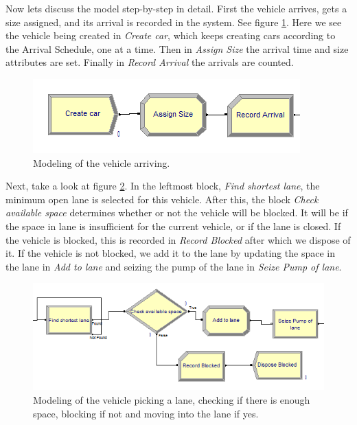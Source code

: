 Now lets discuss the model step-by-step in detail.
First the vehicle arrives, gets a size assigned, and its arrival is recorded in the system. See figure \ref{fig:vehiclearrives}. Here we see the vehicle being created in \textit{Create car}, which keeps creating cars according to the Arrival Schedule, one at a time. Then in \textit{Assign Size} the arrival time and size attributes are set. Finally in \textit{Record Arrival} the arrivals are counted.

\begin{figure}[]
\begin{center}
	\includegraphics[scale=1]{images/model-description/vehicle-arrives.PNG}
	\caption{Modeling of the vehicle arriving.}
	\label{fig:vehiclearrives}
\end{center}
\end{figure}

Next, take a look at figure \ref{fig:picklane}. In the leftmost block, \textit{Find shortest lane}, the minimum open lane is selected for this vehicle. After this, the block \textit{Check available space} determines whether or not the vehicle will be blocked. It will be if the space in lane is insufficient for the current vehicle, or if the lane is closed. If the vehicle is blocked, this is recorded in \textit{Record Blocked} after which we dispose of it. If the vehicle is not blocked, we add it to the lane by updating the space in the lane in \textit{Add to lane} and seizing the pump of the lane in \textit{Seize Pump of lane}.

\begin{figure}[]
\begin{center}
	\includegraphics[scale=1]{images/model-description/pick-lane.PNG}
	\caption{Modeling of the vehicle picking a lane, checking if there is enough space, blocking if not and moving into the lane if yes.}
	\label{fig:picklane}
\end{center}
\end{figure}

